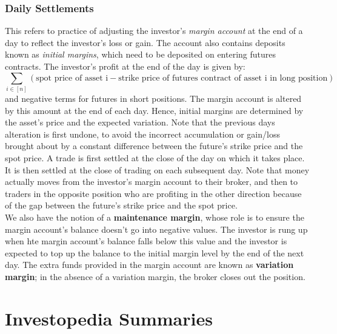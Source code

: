 \documentclass{article}
\begin{document}
\subsubsection*{Daily Settlements}
This refers to practice of adjusting the investor's \emph{margin account} at the end of a day to reflect the investor's 
loss or gain. The account also contains deposits known as \emph{initial margins}, which need to be deposited on entering
futures contracts. The investor's profit at the end of the day is given by:
\begin{equation}
    \sum_{i \in [n]}{(\text{spot price of asset i} - \text{strike price of futures contract of asset i in long position})}
\end{equation}
and negative terms for futures in short positions.
The margin account is altered by this amount at the end of each day. Hence, initial margins are determined by the asset's price
and the expected variation. Note that the previous days alteration is first undone, to avoid the incorrect accumulation
or gain/loss brought about by a constant difference between the future's strike price and the spot price. A trade is first
settled at the close of the day on which it takes place. It is then settled at the
close of trading on each subsequent day. Note that money actually moves from the investor's margin account to their broker,
and then to traders in the opposite position who are profiting in the other direction because of the gap between the future's
strike price and the spot price.\\
We also have the notion of a \textbf{maintenance margin}, whose role is to ensure the margin account's balance doesn't go into 
negative values. The investor is rung up when hte margin account's balance falls below this value and the investor is expected
to top up the balance to the initial margin level by the end of the next day. The extra funds provided in the margin account 
are known as \textbf{variation margin}; in the absence of a variation margin, the broker closes out the position.
\section{Investopedia Summaries}
\end{document}
